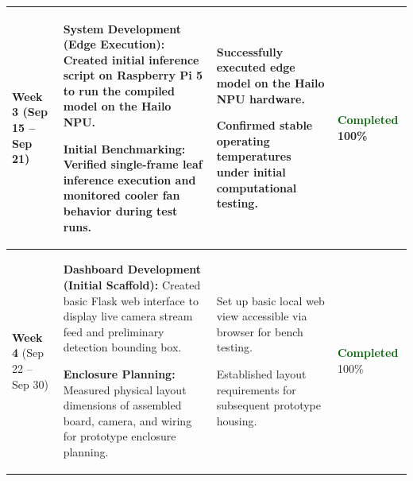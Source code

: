 \documentclass[10pt,a4paper]{article}
\begin{document}
\begin{tabularx}{\textwidth}{@{} p{2.2cm} >{\raggedright\arraybackslash}X >{\raggedright\arraybackslash}X p{2.0cm} @{}}
\midrule

\textbf{Week 3}\newline
\footnotesize{(Sep 15 -- Sep 21)} & 
\begin{tableitems}
    \item \textbf{System Development (Edge Execution):} Created initial inference script on Raspberry Pi 5 to run the compiled model on the Hailo NPU.
    \item \textbf{Initial Benchmarking:} Verified single-frame leaf inference execution and monitored cooler fan behavior during test runs.
\end{tableitems} & 
\begin{tableitems}
    \item Successfully executed edge model on the Hailo NPU hardware.
    \item Confirmed stable operating temperatures under initial computational testing.
\end{tableitems} & 
\textcolor{darkgreen}{\textbf{Completed}}\newline
\footnotesize{100\%} \\

\midrule

\textbf{Week 4}\newline
\footnotesize{(Sep 22 -- Sep 30)} & 
\begin{tableitems}
    \item \textbf{Dashboard Development (Initial Scaffold):} Created basic Flask web interface to display live camera stream feed and preliminary detection bounding box.
    \item \textbf{Enclosure Planning:} Measured physical layout dimensions of assembled board, camera, and wiring for prototype enclosure planning.
\end{tableitems} & 
\begin{tableitems}
    \item Set up basic local web view accessible via browser for bench testing.
    \item Established layout requirements for subsequent prototype housing.
\end{tableitems} & 
\textcolor{darkgreen}{\textbf{Completed}}\newline
\footnotesize{100\%} \\

\bottomrule
\end{tabularx}

\vspace{1.2cm}
\end{document}
